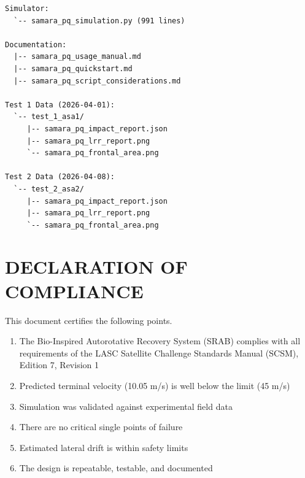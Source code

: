 \documentclass[12pt,a4paper]{article}
\begin{document}
\begin{verbatim}
Simulator:
  `-- samara_pq_simulation.py (991 lines)

Documentation:
  |-- samara_pq_usage_manual.md
  |-- samara_pq_quickstart.md
  |-- samara_pq_script_considerations.md

Test 1 Data (2026-04-01):
  `-- test_1_asa1/
     |-- samara_pq_impact_report.json
     |-- samara_pq_lrr_report.png
     `-- samara_pq_frontal_area.png

Test 2 Data (2026-04-08):
  `-- test_2_asa2/
     |-- samara_pq_impact_report.json
     |-- samara_pq_lrr_report.png
     `-- samara_pq_frontal_area.png
\end{verbatim}

\vspace{0.5em}

\section{DECLARATION OF COMPLIANCE}
\label{sec:declaration-compliance}

This document certifies the following points.

\begin{enumerate}[label=\arabic*.]
    \item The Bio-Inspired Autorotative Recovery System (SRAB) complies with all requirements of the LASC Satellite Challenge Standards Manual (SCSM), Edition 7, Revision 1
    \item Predicted terminal velocity (10.05 m/s) is well below the limit (45 m/s)
    \item Simulation was validated against experimental field data
    \item There are no critical single points of failure
    \item Estimated lateral drift is within safety limits
    \item The design is repeatable, testable, and documented
\end{enumerate}
\end{document}
